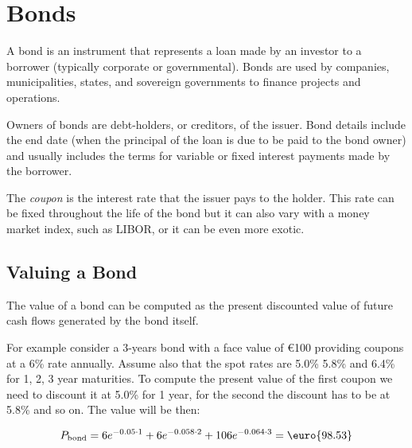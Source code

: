 \chapter{Bonds}
\label{bonds}

A bond is an instrument that represents a loan made by an investor to a
borrower (typically corporate or governmental). Bonds are used by
companies, municipalities, states, and sovereign governments to finance
projects and operations. 

Owners of bonds are debt-holders, or creditors,
of the issuer. Bond details include the end date (when the principal of
the loan is due to be paid to the bond owner) and usually includes the
terms for variable or fixed interest payments made by the borrower.

The \emph{coupon} is the interest rate that the issuer pays to the holder.
This rate can be fixed throughout the life of the bond but it can also
vary with a money market index, such as LIBOR, or it can be even more
exotic.

\section{Valuing a Bond}
\label{sec:bond_pricing}

The value of a bond can be computed as the present discounted value of
future cash flows generated by the bond itself.

For example consider a 3-years bond with a face value of \euro{100}
providing coupons at a 6\% rate annually. Assume also that the spot
rates are 5.0\% 5.8\% and 6.4\% for 1, 2, 3 year maturities. To
compute the present value of the first coupon we need to discount it at
5.0\% for 1 year, for the second the discount has to be at 5.8\% and so
on. The value will be then:

\[P_{\mathrm{bond}}=6e^{-0.05\cdot 1}+6e^{-0.058\cdot 2}+106e^{-0.064\cdot 3} = \textrm{\euro{98.53}}\]

